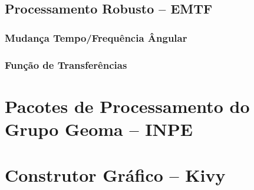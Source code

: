     \subsection{Processamento Robusto -- EMTF}
            
        \subsubsection{Mudança Tempo/Frequência Ângular}
            
        \subsubsection{Função de Transferências}
           
    \section{Pacotes de Processamento do Grupo Geoma -- INPE}
    
    \section{Construtor Gráfico -- Kivy}

    
